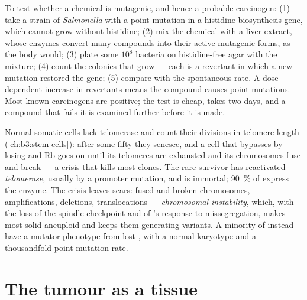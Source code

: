 \begin{method}\label{met:b3:cancer-biology:ames}
To test whether a chemical is mutagenic, and hence a probable
carcinogen: (1) take a strain of \emph{Salmonella} with a point mutation
in a histidine biosynthesis gene, which cannot grow without histidine;
(2) mix the chemical with a liver extract, whose enzymes convert many
compounds into their active mutagenic forms, as the body would; (3)
plate some $10^{8}$ bacteria on histidine-free agar with the mixture;
(4) count the colonies that grow --- each is a revertant in which a new
mutation restored the gene; (5) compare with the spontaneous rate. A
dose-dependent increase in revertants means the compound causes point
mutations. Most known carcinogens are positive; the test is cheap,
takes two days, and a compound that fails it is examined further
before it is made.
\end{method}

\begin{definition}\label{def:b3:cancer-biology:telomerase}
Normal somatic cells lack telomerase and count their divisions in
telomere length (\cref{ch:b3:stem-cells}): after some fifty they
senesce, and a cell that bypasses  by losing  and Rb goes
on until its telomeres are exhausted and its chromosomes fuse and break
--- a crisis that kills most clones. The rare survivor has reactivated
\emph{telomerase}, usually by a promoter mutation, and is immortal;
\qty{90}{\%} of  express the enzyme. The crisis leaves scars:
fused and broken chromosomes, amplifications, deletions, translocations
--- \emph{chromosomal instability}, which, with the loss of the spindle
checkpoint and of 's response to missegregation, makes most solid
 aneuploid and keeps them generating variants. A minority of
 instead have a mutator phenotype from lost ,
with a normal karyotype and a thousandfold point-mutation rate.
\end{definition}

\section{The tumour as a tissue}

